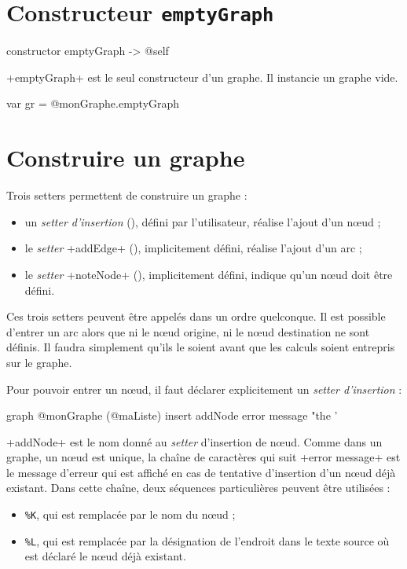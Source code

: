 \section{Constructeur \texttt{emptyGraph}}

\begin{galgas3}
constructor emptyGraph -> @self
\end{galgas3}

\ggst+emptyGraph+ est le seul constructeur d'un graphe. Il instancie un graphe vide.

\begin{galgas3}
var gr = @monGraphe.emptyGraph
\end{galgas3}



\section{Construire un graphe}

Trois setters permettent de construire un graphe :
\begin{itemize}
  \item un \emph{setter d'insertion} (), défini par l'utilisateur, réalise l'ajout d'un nœud ;
  \item le \emph{setter} \ggst+addEdge+ (), implicitement défini, réalise l'ajout d'un arc ;
  \item le \emph{setter} \ggst+noteNode+ (), implicitement défini, indique qu'un nœud doit être défini.
\end{itemize}

Ces trois setters peuvent être appelés dans un ordre quelconque. Il est possible d'entrer un arc alors que ni le nœud origine, ni le nœud destination ne sont définis. Il faudra simplement qu'ils le soient avant que les calculs soient entrepris sur le graphe.


Pour pouvoir entrer un nœud, il faut déclarer explicitement un \emph{setter d'insertion} :
\begin{galgas3}
graph @monGraphe (@maListe) {
  insert addNode error message "the '%
}
\end{galgas3}

\ggst+addNode+ est le nom donné au \emph{setter} d'insertion de nœud. Comme dans un graphe, un nœud est unique, la chaîne de caractères qui suit \ggst+error message+ est le message d'erreur qui est affiché en cas de tentative d'insertion d'un nœud déjà existant. Dans cette chaîne, deux séquences particulières peuvent être utilisées :
\begin{itemize}
  \item \texttt{\%K}, qui est remplacée par le nom du nœud ;
  \item \texttt{\%L}, qui est remplacée par la désignation de l'endroit dans le texte source où est déclaré le nœud déjà existant.
\end{itemize}

